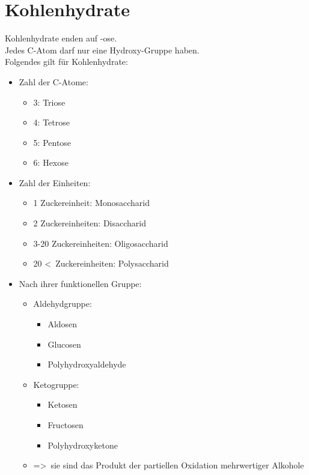 
\section{Kohlenhydrate} \label{sec:kohlenhydrate}

Kohlenhydrate enden auf -ose. \\
Jedes C-Atom darf nur eine Hydroxy-Gruppe haben. \\
Folgendes gilt für Kohlenhydrate:
\begin{itemize}
    \item Zahl der C-Atome:
        \begin{itemize}
            \item 3: Triose
            \item 4: Tetrose
            \item 5: Pentose
            \item 6: Hexose
        \end{itemize}
    \item Zahl der Einheiten:
        \begin{itemize}
            \item 1 Zuckereinheit: Monosaccharid
            \item 2 Zuckereinheiten: Disaccharid
            \item 3-20 Zuckereinheiten: Oligosaccharid
            \item 20 \textless\ Zuckereinheiten: Polysaccharid
        \end{itemize}
    \item Nach ihrer funktionellen Gruppe:
        \begin{itemize}
            \item Aldehydgruppe:
                \begin{itemize}
                    \item Aldosen
                    \item Glucosen
                    \item Polyhydroxyaldehyde
                \end{itemize}
            \item Ketogruppe:
                \begin{itemize}
                    \item Ketosen
                    \item Fructosen
                    \item Polyhydroxyketone
                \end{itemize}
            \item =\textgreater\ sie sind das Produkt der partiellen Oxidation mehrwertiger Alkohole
        \end{itemize}
\end{itemize}

